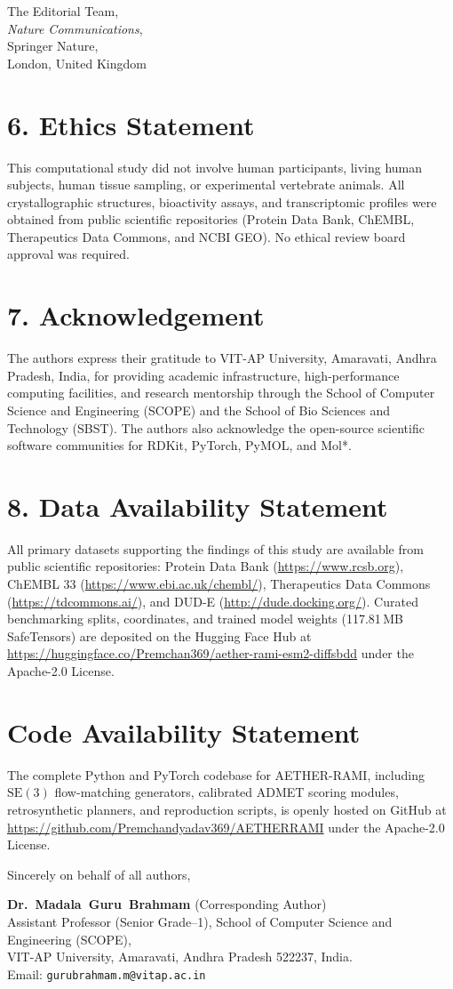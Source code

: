 \documentclass[11pt]{letter}
\begin{document}
\begin{letter}{%
    The Editorial Team,\\
    \textit{Nature Communications},\\
    Springer Nature,\\
    London, United Kingdom
}
\section*{6. Ethics Statement}
This computational study did not involve human participants, living human subjects, human tissue sampling, or experimental vertebrate animals. All crystallographic structures, bioactivity assays, and transcriptomic profiles were obtained from public scientific repositories (Protein Data Bank, ChEMBL, Therapeutics Data Commons, and NCBI GEO). No ethical review board approval was required.

\section*{7. Acknowledgement}
The authors express their gratitude to VIT-AP University, Amaravati, Andhra Pradesh, India, for providing academic infrastructure, high-performance computing facilities, and research mentorship through the School of Computer Science and Engineering (SCOPE) and the School of Bio Sciences and Technology (SBST). The authors also acknowledge the open-source scientific software communities for RDKit, PyTorch, PyMOL, and Mol*.

\section*{8. Data Availability Statement}
All primary datasets supporting the findings of this study are available from public scientific repositories: Protein Data Bank (\url{https://www.rcsb.org}), ChEMBL 33 (\url{https://www.ebi.ac.uk/chembl/}), Therapeutics Data Commons (\url{https://tdcommons.ai/}), and DUD-E (\url{http://dude.docking.org/}). Curated benchmarking splits, coordinates, and trained model weights (117.81\,MB SafeTensors) are deposited on the Hugging Face Hub at \url{https://huggingface.co/Premchan369/aether-rami-esm2-diffsbdd} under the Apache-2.0 License.

\section*{Code Availability Statement}
The complete Python and PyTorch codebase for AETHER-RAMI, including $\mathrm{SE}(3)$ flow-matching generators, calibrated ADMET scoring modules, retrosynthetic planners, and reproduction scripts, is openly hosted on GitHub at \url{https://github.com/Premchandyadav369/AETHERRAMI} under the Apache-2.0 License.

\vspace{1.5em}
\closing{Sincerely on behalf of all authors,}

\noindent
\textbf{Dr.~Madala~Guru~Brahmam} (Corresponding Author)\\
Assistant Professor (Senior Grade--1), School of Computer Science and Engineering (SCOPE),\\
VIT-AP University, Amaravati, Andhra Pradesh 522237, India.\\
Email: \texttt{gurubrahmam.m@vitap.ac.in}

\end{letter}
\end{document}
